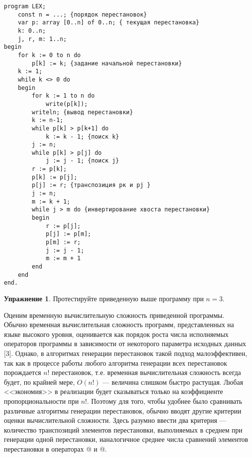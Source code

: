 \documentclass[12pt,a4paper]{article}
\theoremstyle{plain}
\theoremstyle{definition}
\newtheorem*{task}{Упражнение}
\theoremstyle{remark}
\newtheorem*{comment}{Комментарий}
\begin{document}
\begin{verbatim}
program LEX;
    const n = ...; {порядок перестановок}
    var p: array [0..n] of 0..n; { текущая перестановка}
    k: 0..n;
    j, r, m: 1..n;
begin
    for k := 0 to n do
        p[k] := k; {задание начальной перестановки}
    k := 1;
    while k <> 0 do
    begin
        for k := 1 to n do
            write(p[k]);
        writeln; {вывод перестановки}
        k := n-1;
        while p[k] > p[k+1] do
            k := k - 1; {поиcк k}
        j := n;
        while p[k] > p[j] do
            j := j - 1; {поиск j}
        r := p[k];
        p[k] := p[j];
        p[j] := r; {транспозиция рк и pj }
        j := n;
        m := k + 1;
        while j > m do {инвертирование хвоста перестановки}
        begin
            r := p[j];
            p[j] := p[m];
            p[m] := r;
            j := j - 1;
            m := m + 1
        end
    end
end.
\end{verbatim}

\begin{comment}
Нулевой элемент включен в массив $p$ для того, чтобы обеспечить конец цикла \verb@{поиск k}@ после генерации последней перестановки.
\end{comment}

\begin{task}
Протестируйте приведенную выше программу при $n=3$.
\end{task}

Оценим временную вычислительную сложность приведенной программы. Обычно временная вычислительная сложность программ, представленных на языке высокого уровня, оценивается как порядок роста числа исполняемых операторов программы в зависимости от некоторого параметра исходных данных [3]. Однако, в алгоритмах генерации перестановок такой подход малоэффективен, так как в процессе работы любого алгоритма генерации всех перестановок порождается $n!$ перестановок, т.е. временная вычислительная сложность всегда будет, по крайней мере, $O(n!)$ --- величина слишком быстро растущая. Любая <<экономия>> в реализации будет сказываться только на коэффициенте пропорциональности при $n!$. Поэтому для того, чтобы удобнее было сравнивать различные алгоритмы генерации перестановок, обычно вводят другие критерии оценки вычислительной сложности. Здесь разумно ввести два критерия --- количество транспозиций элементов перестановки, выполняемых в среднем при генерации одной перестановки, ианалогичное среднее числа сравнений элементов перестановки в операторах @ и @.
\end{document}
